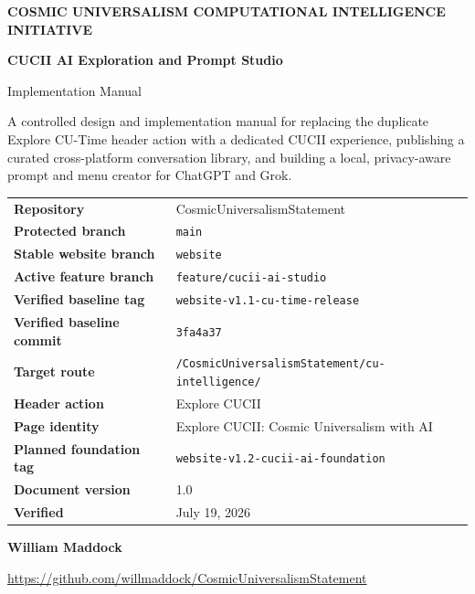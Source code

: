 \documentclass[11pt,letterpaper]{article}
\newcommand{\ProjectTitle}{CUCII AI Exploration and Prompt Studio}
\newcommand{\DocumentTitle}{Implementation Manual}
\newcommand{\RepositoryName}{CosmicUniversalismStatement}
\newcommand{\RepositoryURL}{https://github.com/willmaddock/CosmicUniversalismStatement}
\newcommand{\StableBranch}{website}
\newcommand{\FeatureBranch}{feature/cucii-ai-studio}
\newcommand{\TargetRoute}{/CosmicUniversalismStatement/cu-intelligence/}
\newcommand{\BaselineTag}{website-v1.1-cu-time-release}
\newcommand{\BaselineCommit}{3fa4a37}
\newcommand{\FoundationTag}{website-v1.2-cucii-ai-foundation}
\newcommand{\DocumentVersion}{1.0}
\newcommand{\VerificationDate}{July 19, 2026}
\newcommand{\AuthorName}{William Maddock}
\begin{document}
\begin{titlepage}
\pagecolor{CUNavy}
\color{white}
\thispagestyle{empty}

\vspace*{0.65in}

{\small\bfseries\color{CUCyanLight}
COSMIC UNIVERSALISM COMPUTATIONAL INTELLIGENCE INITIATIVE}

\vspace{0.42in}

{\Huge\bfseries
\ProjectTitle}

\vspace{0.18in}

{\LARGE\color{CUGoldLight}
\DocumentTitle}

\vspace{0.32in}

{\large
A controlled design and implementation manual for replacing the duplicate
Explore CU-Time header action with a dedicated CUCII experience, publishing a
curated cross-platform conversation library, and building a local, privacy-aware
prompt and menu creator for ChatGPT and Grok.}

\vfill

\begin{tcolorbox}[
    colback=CUNavyTwo,
    colframe=CUBlue,
    boxrule=0.8pt,
    arc=2mm,
    width=\textwidth
]
\color{white}
\begin{tabularx}{\textwidth}{>{\bfseries}L{1.72in}Y}
Repository & \RepositoryName \\
Protected branch & \texttt{main} \\
Stable website branch & \texttt{\StableBranch} \\
Active feature branch & \texttt{\FeatureBranch} \\
Verified baseline tag & \texttt{\BaselineTag} \\
Verified baseline commit & \texttt{\BaselineCommit} \\
Target route & \texttt{\TargetRoute} \\
Header action & Explore CUCII \\
Page identity & Explore CUCII: Cosmic Universalism with AI \\
Planned foundation tag & \texttt{\FoundationTag} \\
Document version & \DocumentVersion \\
Verified & \VerificationDate \\
\end{tabularx}
\end{tcolorbox}

\vfill

{\large\bfseries \AuthorName}

\vspace{0.1in}

{\small \href{\RepositoryURL}{\RepositoryURL}}

\vspace{0.4in}

\end{titlepage}
\end{document}
